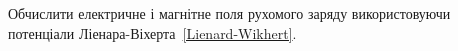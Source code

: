 \begin{problem}
Обчислити електричне і магнітне поля рухомого заряду використовуючи потенціали Ліенара-Віхерта~\eqref{Lienard-Wikhert}.
%
%
%
\end{problem}

